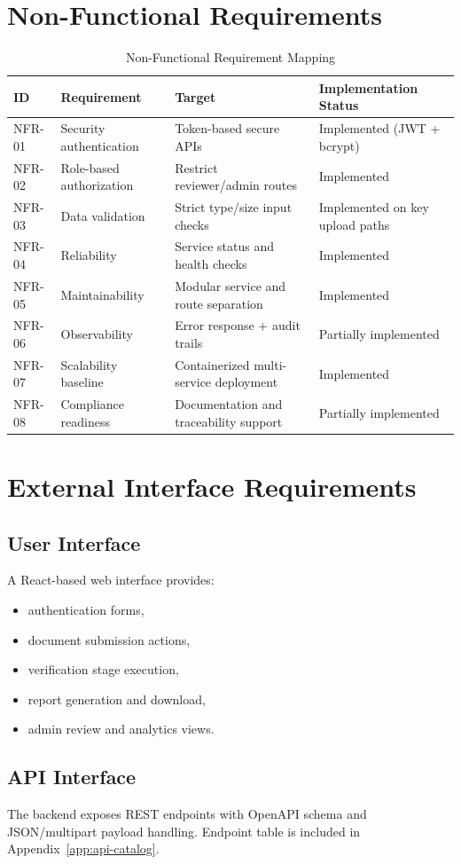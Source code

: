 
\section{Non-Functional Requirements}
\begin{longtable}{p{1.7cm}p{5.2cm}p{2.8cm}p{4.6cm}}
\caption{Non-Functional Requirement Mapping}\\
\toprule
ID & Requirement & Target & Implementation Status \\
\midrule
NFR-01 & Security authentication & Token-based secure APIs & Implemented (JWT + bcrypt) \\
NFR-02 & Role-based authorization & Restrict reviewer/admin routes & Implemented \\
NFR-03 & Data validation & Strict type/size input checks & Implemented on key upload paths \\
NFR-04 & Reliability & Service status and health checks & Implemented \\
NFR-05 & Maintainability & Modular service and route separation & Implemented \\
NFR-06 & Observability & Error response + audit trails & Partially implemented \\
NFR-07 & Scalability baseline & Containerized multi-service deployment & Implemented \\
NFR-08 & Compliance readiness & Documentation and traceability support & Partially implemented \\
\bottomrule
\end{longtable}

\section{External Interface Requirements}
\subsection{User Interface}
A React-based web interface provides:
\begin{itemize}
\item authentication forms,
\item document submission actions,
\item verification stage execution,
\item report generation and download,
\item admin review and analytics views.
\end{itemize}

\subsection{API Interface}
The backend exposes REST endpoints with OpenAPI schema and JSON/multipart payload handling. Endpoint table is included in Appendix~\ref{app:api-catalog}.

